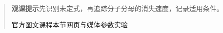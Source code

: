 \begin{quote}\small\textbf{观课提示}\quad 先识别未定式，再追踪分子分母的消失速度，记录适用条件。

\href{https://www.3blue1brown.com/lessons/l-hopitals-rule/}{官方图文课程}\quad\href{https://vitael04213.github.io/3blue1brown-notes/lessons/l-hopitals-rule.html}{本节网页与媒体}\quad\href{https://vitael04213.github.io/3blue1brown-notes/lab.html\#derivative}{参数实验}
\end{quote}
